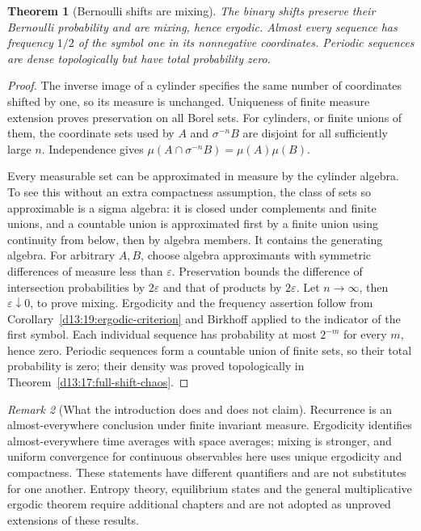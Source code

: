 \documentclass[11pt,oneside]{book}
\newtheorem{theorem}{Theorem}[chapter]
\theoremstyle{definition}
\theoremstyle{remark}\newtheorem{remark}[theorem]{Remark}
\begin{document}
\begin{theorem}[Bernoulli shifts are mixing]\label{d13:19:bernoulli-mixing}
The binary shifts preserve their Bernoulli probability and are mixing,
hence ergodic. Almost every sequence has frequency \(1/2\) of the
symbol one in its nonnegative coordinates. Periodic sequences are
dense topologically but have total probability zero.
\end{theorem}
\begin{proof}
The inverse image of a cylinder specifies the same number of
coordinates shifted by one, so its measure is unchanged.
Uniqueness of finite measure extension proves preservation on
all Borel sets. For cylinders, or finite unions of them, the
coordinate sets used by \(A\) and \(\sigma^{-n}B\) are disjoint
for all sufficiently large \(n\). Independence gives
\(\mu(A\cap\sigma^{-n}B)=\mu(A)\mu(B)\).

Every measurable set can be approximated in measure by the cylinder
algebra. To see this without an extra compactness assumption, the
class of sets so approximable is a sigma algebra: it is closed
under complements and finite unions, and a countable union is
approximated first by a finite union using continuity from below,
then by algebra members. It contains the generating algebra.
For arbitrary \(A,B\), choose algebra approximants with symmetric
differences of measure less than \(\varepsilon\). Preservation
bounds the difference of intersection probabilities by \(2\varepsilon\)
and that of products by \(2\varepsilon\).
Let \(n\to\infty\), then \(\varepsilon\downarrow0\), to prove mixing.
Ergodicity and the frequency assertion follow from
Corollary~\ref{d13:19:ergodic-criterion} and Birkhoff applied to
the indicator of the first symbol.
Each individual sequence has probability at most \(2^{-m}\) for
every \(m\), hence zero. Periodic sequences form a countable
union of finite sets, so their total probability is zero;
their density was proved topologically in
Theorem~\ref{d13:17:full-shift-chaos}.
\end{proof}

\begin{remark}[What the introduction does and does not claim]
Recurrence is an almost-everywhere conclusion under finite invariant
measure. Ergodicity identifies almost-everywhere time averages with
space averages; mixing is stronger, and uniform convergence for
continuous observables here uses unique ergodicity and compactness.
These statements have different quantifiers and are not substitutes
for one another. Entropy theory, equilibrium states and the general
multiplicative ergodic theorem require additional chapters and are
not adopted as unproved extensions of these results.
\end{remark}
\end{document}
